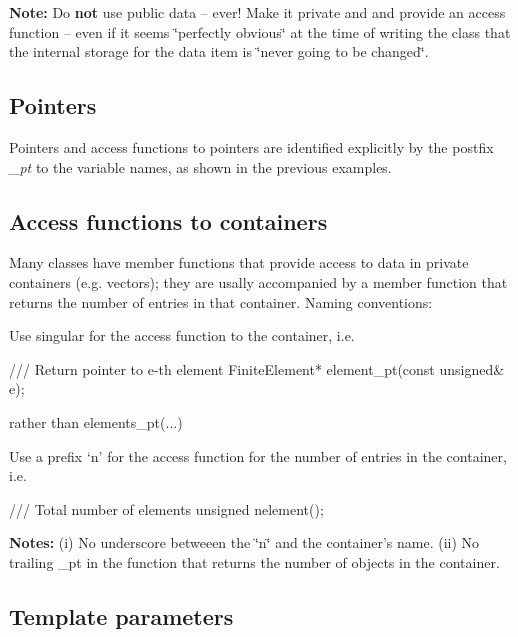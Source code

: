 {\bfseries Note\-:} Do {\bfseries not} use public data -- ever! Make it private and and provide an access function -- even if it seems \char`\"{}perfectly
 obvious\char`\"{} at the time of writing the class that the internal storage for the data item is \char`\"{}never going to be changed\char`\"{}.\hypertarget{index_pointers}{}\subsection{Pointers}\label{index_pointers}

\begin{DoxyItemize}
\item Pointers and access functions to pointers are identified explicitly by the postfix {\itshape \-\_\-pt} to the variable names, as shown in the previous examples.
\end{DoxyItemize}\hypertarget{index_numbering}{}\subsection{Access functions to containers}\label{index_numbering}
Many classes have member functions that provide access to data in private containers (e.\-g. vectors); they are usally accompanied by a member function that returns the number of entries in that container. Naming conventions\-:
\begin{DoxyItemize}
\item Use singular for the access function to the container, i.\-e. 
\begin{DoxyCode}
\textcolor{comment}{/// Return pointer to e-th element}
\textcolor{comment}{}FiniteElement* element\_pt(\textcolor{keyword}{const} \textcolor{keywordtype}{unsigned}& e);
\end{DoxyCode}
 rather than {\ttfamily elements\-\_\-pt}(...)
\item Use a prefix `{\ttfamily n'} for the access function for the number of entries in the container, i.\-e. 
\begin{DoxyCode}
\textcolor{comment}{/// Total number of elements }
\textcolor{comment}{}\textcolor{keywordtype}{unsigned} nelement();
\end{DoxyCode}
 {\bfseries Notes\-:} (i) No underscore betweeen the \char`\"{}n\char`\"{} and the container's name. (ii) No trailing {\ttfamily \-\_\-pt} in the function that returns the number of objects in the container.
\end{DoxyItemize}\hypertarget{index_template}{}\subsection{Template parameters}\label{index_template}

